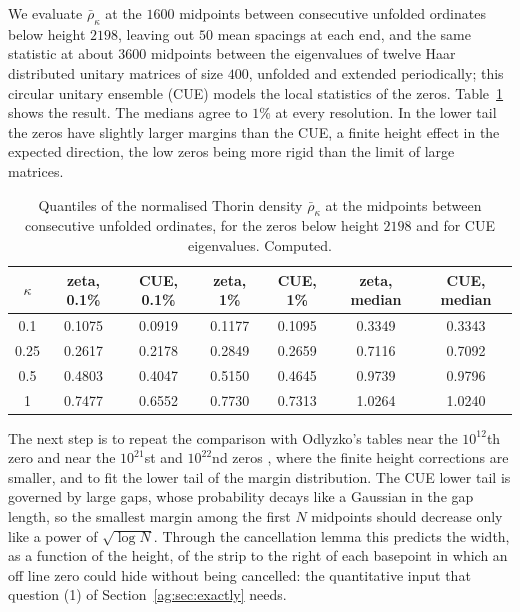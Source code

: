 We evaluate $\bar\rho_\kappa$ at the $1600$ midpoints between consecutive unfolded ordinates below height $2198$, leaving out $50$ mean spacings at each end, and the same statistic at about $3600$ midpoints between the eigenvalues of twelve Haar distributed unitary matrices of size $400$, unfolded and extended periodically; this circular unitary ensemble (CUE) models the local statistics of the zeros. Table~\ref{ag:tab:margin} shows the result. The medians agree to $1\%$ at every resolution. In the lower tail the zeros have slightly larger margins than the CUE, a finite height effect in the expected direction, the low zeros being more rigid than the limit of large matrices.

\begin{table}[htbp]
\centering\small
\begin{tabular}{ccccccc}
\toprule
$\kappa$ & zeta, 0.1\% & CUE, 0.1\% & zeta, 1\% & CUE, 1\% & zeta, median & CUE, median\\
\midrule
0.1 & 0.1075 & 0.0919 & 0.1177 & 0.1095 & 0.3349 & 0.3343\\
0.25 & 0.2617 & 0.2178 & 0.2849 & 0.2659 & 0.7116 & 0.7092\\
0.5 & 0.4803 & 0.4047 & 0.5150 & 0.4645 & 0.9739 & 0.9796\\
1 & 0.7477 & 0.6552 & 0.7730 & 0.7313 & 1.0264 & 1.0240\\
\bottomrule
\end{tabular}
\caption{Quantiles of the normalised Thorin density $\bar\rho_\kappa$ at the midpoints between consecutive unfolded ordinates, for the zeros below height $2198$ and for CUE eigenvalues. Computed.}
\label{ag:tab:margin}
\end{table}

The next step is to repeat the comparison with Odlyzko's tables near the $10^{12}$th zero \cite{Odlyzko87} and near the $10^{21}$st and $10^{22}$nd zeros \cite{Odlyzko01,OdlyzkoTables}, where the finite height corrections are smaller, and to fit the lower tail of the margin distribution. The CUE lower tail is governed by large gaps, whose probability decays like a Gaussian in the gap length, so the smallest margin among the first $N$ midpoints should decrease only like a power of $\sqrt{\log N}$. Through the cancellation lemma this predicts the width, as a function of the height, of the strip to the right of each basepoint in which an off line zero could hide without being cancelled: the quantitative input that question (1) of Section~\ref{ag:sec:exactly} needs.

